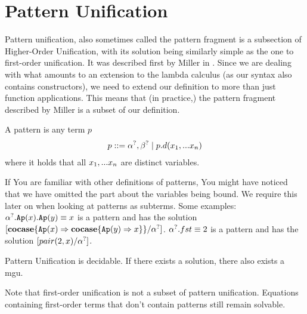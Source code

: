 \documentclass[twoside,12pt,a4paper]{article}
\begin{document}
\section{Pattern Unification}

Pattern unification, also sometimes called the pattern fragment
is a subsection of Higher-Order Unification,
with its solution being similarly simple as the one to first-order unification.
It was described first by Miller in \cite{10.1093/logcom/1.4.497}.
Since we are dealing with what amounts to an extension to the lambda calculus (as our syntax also contains constructors), we need to extend our definition to more than just function applications. 
This means that (in practice,) the pattern fragment described by Miller is a subset of our definition.

\begin{definition}[Pattern]
    A pattern is any term $p$ 
    \begin{align*}
        p ::= \alpha^?, \beta^? \;|\; p.d(x_1,...x_n)
    \end{align*}
    where it holds that all $x_1,...x_n$ are distinct variables.
\end{definition}

If You are familiar with other definitions of patterns, You might have noticed that 
we have omitted the part about the variables being bound. We require this later on when looking at patterns as subterms.
Some examples:
$\alpha^?.\texttt{Ap}(x).\texttt{Ap}(y)\equiv x$ is a pattern and has the solution $[\textbf{cocase}\{\texttt{Ap}(x)\Rightarrow\textbf{cocase}\{\texttt{Ap}(y)\Rightarrow x\}\}/\alpha^?]$.
$\alpha^?.fst \equiv 2$ is a pattern and has the solution $[pair(2,x)/\alpha^?]$.


\begin{theorem}
    Pattern Unification is decidable. If there exists a solution, there also exists a mgu.
\end{theorem}

Note that first-order unification is not a subset of pattern unification. 
Equations containing first-order terms that don't contain patterns still remain solvable.
\end{document}
